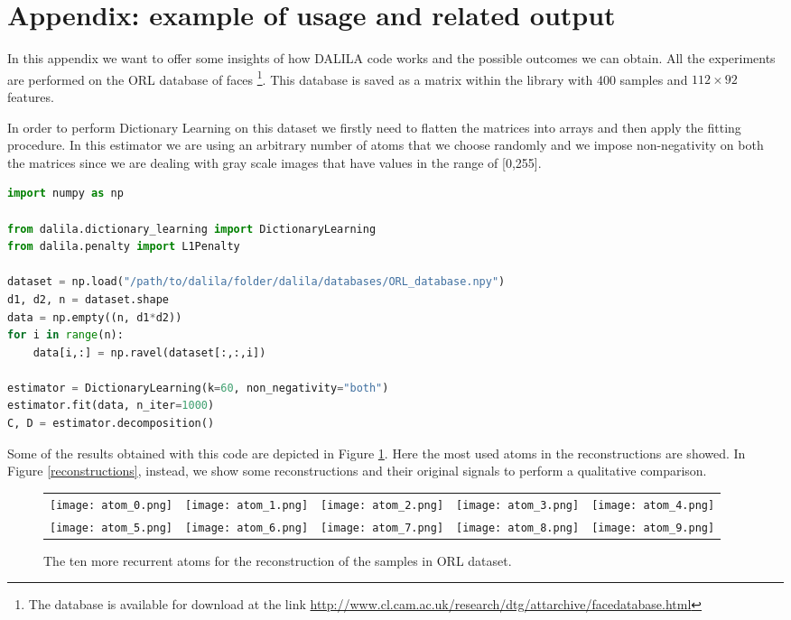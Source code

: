 \appendix

\section{Appendix: example of usage and related output}
In this appendix we want to offer some insights of how DALILA code works and the possible outcomes we can obtain. All the experiments are performed on the ORL database of faces \footnote{The database is available for download at the link \url{http://www.cl.cam.ac.uk/research/dtg/attarchive/facedatabase.html}}. This database is saved as a matrix within the library with 400 samples and $112\times 92$ features.

In order to perform Dictionary Learning on this dataset we firstly need to flatten the matrices into arrays and then apply the fitting procedure. In this estimator we are using an arbitrary number of atoms that we choose randomly and we impose non-negativity on both the matrices since we are dealing with gray scale images that have values in the range of [0,255]. 
\begin{lstlisting}[language=Python]
import numpy as np

from dalila.dictionary_learning import DictionaryLearning
from dalila.penalty import L1Penalty

dataset = np.load("/path/to/dalila/folder/dalila/databases/ORL_database.npy")
d1, d2, n = dataset.shape
data = np.empty((n, d1*d2))
for i in range(n):
	data[i,:] = np.ravel(dataset[:,:,i])

estimator = DictionaryLearning(k=60, non_negativity="both")
estimator.fit(data, n_iter=1000)
C, D = estimator.decomposition()
\end{lstlisting}
Some of the results obtained with this code are depicted in Figure \ref{atoms}. Here the most used atoms in the reconstructions are showed.  In Figure \ref{reconstructions}, instead, we show some reconstructions and their original signals to perform a qualitative comparison.
\begin{figure}[H]
\centering
\begin{tabular}{ccccc}
\texttt{[image: atom\_0.png]} &
\texttt{[image: atom\_1.png]} &
\texttt{[image: atom\_2.png]} &
\texttt{[image: atom\_3.png]} &
\texttt{[image: atom\_4.png]} \\
\texttt{[image: atom\_5.png]} &
\texttt{[image: atom\_6.png]} &
\texttt{[image: atom\_7.png]} &
\texttt{[image: atom\_8.png]} &
\texttt{[image: atom\_9.png]} \\
\end{tabular}
\caption{The ten more recurrent atoms for the reconstruction of the samples in ORL dataset.}
\label{atoms}
\end{figure}

